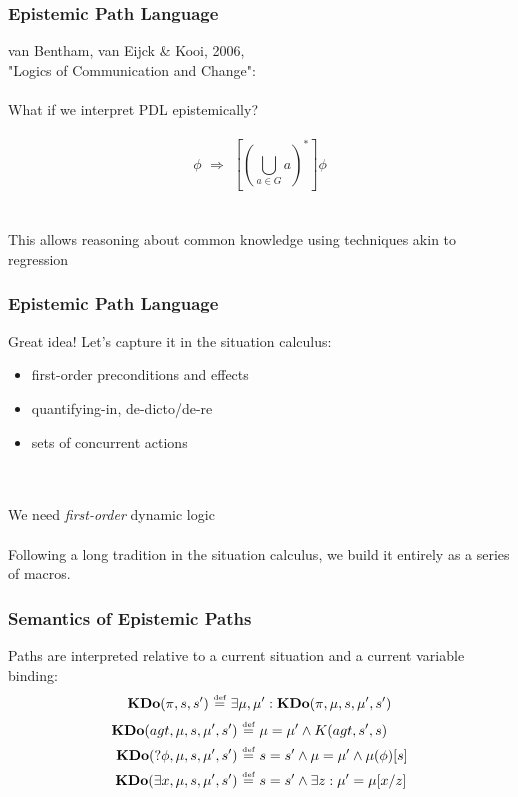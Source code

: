 \documentclass[compress]{beamer}
\newcommand{\isdef}{\hbox{$\stackrel{\mbox{\tiny def}}{=}$}}
\newcommand{\KDo}{\mathbf{KDo}}
\begin{document}
\begin{frame}
\frametitle{Epistemic Path Language}
van Bentham, van Eijck \& Kooi, 2006,\\
"Logics of Communication and Change":
\ \\
\ \\
What if we interpret PDL epistemically?
\pause
\ \\
\ \\
\begin{equation*}
[ C_G ] \phi \,\,\Rightarrow\,\,[ (\bigcup_{a \in G} a)^* ] \phi
\end{equation*}
\ \\
\ \\
\pause
This allows reasoning about common knowledge using techniques akin to regression
\end{frame}

\begin{frame}
\frametitle{Epistemic Path Language}
Great idea!  Let's capture it in the situation calculus:
\begin{itemize}
\item first-order preconditions and effects
\item quantifying-in, de-dicto/de-re
\item sets of concurrent actions
\end{itemize}
\ \\
\ \\
We need \emph{first-order} dynamic logic
\pause
\ \\
\ \\
Following a long tradition in the situation calculus, we build it entirely as a series of macros.
\end{frame}

\begin{frame}
\frametitle{Semantics of Epistemic Paths}
Paths are interpreted relative to a current situation and a current variable binding:
\begin{equation*}
\KDo(\pi,s,s') \,\,\isdef\,\,\exists \mu,\mu': \KDo(\pi,\mu,s,\mu',s')
\end{equation*}
\begin{align*}
\KDo(agt,\mu,s,\mu',s') & \,\,\isdef\,\,\mu = \mu' \wedge K(agt,s',s) \\
\KDo(?\phi,\mu,s,\mu',s') & \,\,\isdef\,\,s = s' \wedge \mu = \mu' \wedge \mu(\phi)[s] \\
\KDo(\exists x,\mu,s,\mu',s') & \,\,\isdef\,\,s = s' \wedge \exists z: \mu' = \mu[x/z] \\
\end{align*}
\end{frame}
\end{document}
